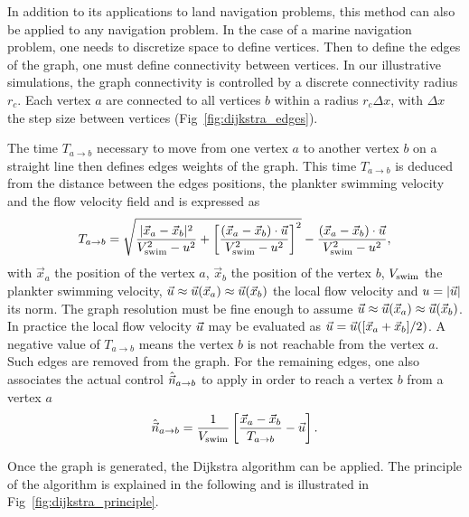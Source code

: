 In addition to its applications to land navigation problems, this method can also be applied to any navigation problem.
In the case of a marine navigation problem, one needs to discretize space to define vertices.
Then to define the edges of the graph, one must define connectivity between vertices.
In our illustrative simulations, the graph connectivity is controlled by a discrete connectivity radius $r_c$.
Each vertex $a$ are connected to all vertices $b$ within a radius $r_c \varDelta x$, with $\varDelta x$ the step size between vertices (Fig~\ref{fig:dijkstra_edges}).

The time $T_{a \to b}$ necessary to move from one vertex $a$ to another vertex $b$ on a straight line then defines edges weights of the graph.
This time $T_{a \to b}$ is deduced from the distance between the edges positions, the plankter swimming velocity and the flow velocity field and is expressed as
\begin{equation}\label{eq:dijkstra_edge_time}
	T_{a \to b} = \sqrt{\frac{\lvert\vec{x}_a - \vec{x}_b\rvert^2}{V_{\mathrm{swim}}^2 - u^2} + \left[ \frac{\left(\vec{x}_a - \vec{x}_b\right) \cdot \vec{u}}{V_{\mathrm{swim}}^2 - u^2} \right]^2} - \frac{\left(\vec{x}_a - \vec{x}_b\right) \cdot \vec{u}}{V_{\mathrm{swim}}^2 - u^2},
\end{equation}
with $\vec{x}_a$ the position of the vertex $a$, $\vec{x}_b$ the position of the vertex $b$, $V_{\mathrm{swim}}$ the plankter swimming velocity, $\vec{u} \approx \vec{u}(\vec{x}_a) \approx \vec{u}(\vec{x}_b)$ the local flow velocity and $u = \lvert\vec{u}\rvert$ its norm.
The graph resolution must be fine enough to assume $\vec{u} \approx \vec{u}(\vec{x}_a) \approx \vec{u}(\vec{x}_b)$.
In practice the local flow velocity $\vec{u}$ may be evaluated as $\vec{u} = \vec{u}([\vec{x}_a + \vec{x}_b]/2)$.
A negative value of $T_{a \to b}$ means the vertex $b$ is not reachable from the vertex $a$. 
Such edges are removed from the graph.
For the remaining edges, one also associates the actual control $\hat{\vec{n}}_{a \to b}$ to apply in order to reach a vertex $b$ from a vertex $a$
\begin{equation}\label{eq:dijkstra_edge_direction}
	\hat{\vec{n}}_{a \to b} = \frac{1}{V_{\mathrm{swim}}} \left[ \frac{\vec{x}_a - \vec{x}_b}{T_{a \to b}} - \vec{u} \right].
\end{equation}

Once the graph is generated, the Dijkstra algorithm can be applied.
The principle of the algorithm is explained in the following and is illustrated in Fig~\ref{fig:dijkstra_principle}.

